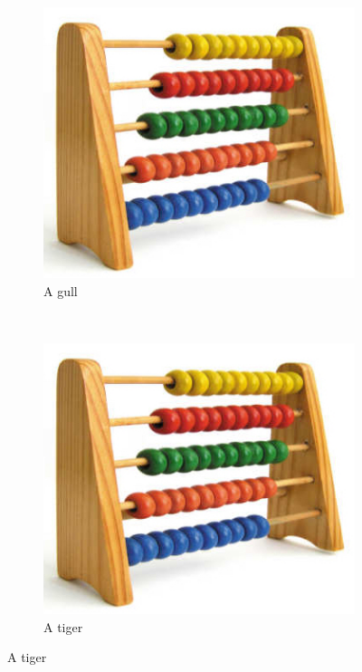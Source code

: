 \documentclass[a4paper]{article}
\begin{document}
\begin{figure}[h]
    \centering
    \begin{subfigure}[b]{0.3\linewidth}
        \includegraphics[width=\textwidth]{kuleramme}
        \caption{A gull}
        \label{fig:gull}
    \end{subfigure}
    ~ 
    \begin{subfigure}[b]{0.3\linewidth}
        \includegraphics[width=\textwidth]{kuleramme}
        \caption{A tiger}

\end{subfigure}
\end{figure}
\end{document}
